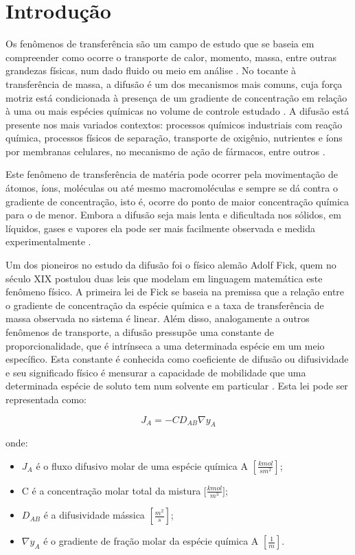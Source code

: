 \chapter{Introdução}

Os fenômenos de transferência são um campo de estudo que se baseia em compreender como ocorre o transporte de calor, momento, massa, entre outras grandezas físicas, num dado fluido ou meio em análise \citep{1,2,3}. No tocante à transferência de massa, a difusão é um dos mecanismos mais comuns, cuja força motriz está condicionada à presença de um gradiente de concentração em relação à uma ou mais espécies químicas no volume de controle estudado \citep{2,3}. A difusão está presente nos mais variados contextos: processos químicos industriais com reação química, processos físicos de separação, transporte de oxigênio, nutrientes e íons por membranas celulares, no mecanismo de ação de fármacos, entre outros \citep{2}.

Este fenômeno de transferência de matéria pode ocorrer pela movimentação de átomos, íons, moléculas ou até mesmo macromoléculas e sempre se dá contra o gradiente de concentração, isto é, ocorre do ponto de maior concentração química para o de menor. Embora a difusão seja mais lenta e dificultada nos sólidos, em líquidos, gases e vapores ela pode ser mais facilmente observada e medida experimentalmente \citep{2,3,4}.

Um dos pioneiros no estudo da difusão foi o físico alemão Adolf Fick, quem no século XIX postulou duas leis que modelam em linguagem matemática este fenômeno físico. A primeira lei de Fick se baseia na premissa que a relação entre o gradiente de concentração da espécie química e a taxa de transferência de massa observada no sistema é linear. Além disso, analogamente a outros fenômenos de transporte, a difusão pressupõe uma constante de proporcionalidade, que é intrínseca a uma determinada espécie em um meio específico. Esta constante é conhecida como coeficiente de difusão ou difusividade e seu significado físico é mensurar a capacidade de mobilidade que uma determinada espécie de soluto tem num solvente em particular \citep{2,4}. Esta lei pode ser representada como: 


\begin{equation}\label{key}
J_{A}=-C D_{A B} \nabla y_{A}
\end{equation}

onde:

\begin{itemize}
	\item $J_{A}$ é o fluxo difusivo molar de uma espécie química A $[\frac{kmol}{sm^{2}}]$;
	\item C é a concentração molar total da mistura [$\frac{kmol}{m^{3}}]$;
	\item $D_{AB}$ é a difusividade mássica $[\frac{m^{2}}{s}]$;
	\item $\nabla y_{A}$ é o gradiente de fração molar da espécie química A $[\frac{1}{m}]$.
\end{itemize}

